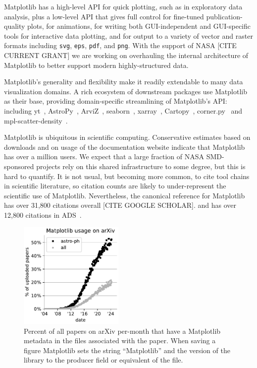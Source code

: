 \documentclass[12pt]{article}
\numberwithin{page}{section}
\begin{document}
Matplotlib has a high-level API for quick plotting, such as in exploratory data
analysis, plus a low-level API that gives full control for fine-tuned
publication-quality plots, for animations, for writing both GUI-independent and
GUI-specific tools for interactive data plotting, and for output to a variety
of vector and raster formats including \texttt{svg}, \texttt{eps},
\texttt{pdf}, and \texttt{png}.  With the support of NASA [CITE CURRENT GRANT]
we are working on overhauling the internal architecture of Matplotlib to better
support modern highly-structured data.

Matplotlib's generality and flexibility make it readily extendable to
many data visualization domains.  A rich ecosystem of downstream packages use
Matplotlib as their base, providing domain-specific streamlining of
Matplotlib's API: including
yt~\cite{2011ApJS..192....9T}, AstroPy~\cite{astropy:2013,
  astropy:2018}, ArviZ~\cite{arviz_2019},
seaborn~\cite{waskom2020seaborn}, xarray~\cite{hoyer2017xarray},
Cartopy~\cite{Cartopy}, corner.py~\cite{corner} and
mpl-scatter-density~\cite{mpl-scatter-density}.

Matplotlib is ubiquitous in scientific computing.  Conservative estimates based
on downloads and on usage of the documentation website indicate that Matplotlib
has over a million users.  We expect that a large fraction of NASA
SMD-sponsored projects rely on this shared infrastructure to some degree, but
this is hard to quantify.  It is not usual, but becoming more common, to cite
tool chains in scientific literature, so citation counts are likely to
under-represent the scientific use of Matplotlib.  Nevertheless, the canonical
reference for Matplotlib~\cite{Hunter:2007} has over 31,800 citations overall
[CITE GOOGLE SCHOLAR].
and has over 12,800 citations in ADS~\cite{ads_mpl}.



\begin{figure}
  \includegraphics[width=0.45\textwidth]{arXiv_usage}
  \caption{\small Percent of all papers on arXiv per-month that have a
    Matplotlib metadata in the files associated with the paper.  When saving a
    figure Matplotlib sets the string ``Matplotlib'' and the version of the
    library to the producer field or equivalent of the file.}
  \label{fig:arxiv}
\end{figure}
\end{document}
